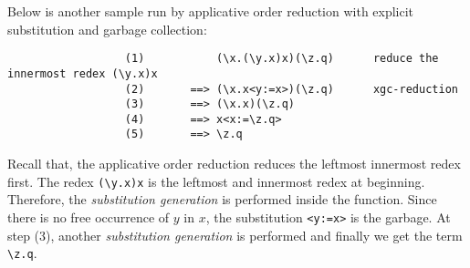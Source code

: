 \begin{exmp}
\normalfont Below is another sample run by applicative order reduction with explicit substitution and garbage collection:
\end{exmp}
\begin{verbatim}
                  (1)           (\x.(\y.x)x)(\z.q)      reduce the innermost redex (\y.x)x
                  (2)       ==> (\x.x<y:=x>)(\z.q)      xgc-reduction
                  (3)       ==> (\x.x)(\z.q)
                  (4)       ==> x<x:=\z.q>
                  (5)       ==> \z.q
\end{verbatim}

Recall that, the applicative order reduction reduces the leftmost innermost redex first. The redex \verb|(\y.x)x| is the leftmost and innermost redex at beginning. Therefore, the \textit{substitution generation} is performed inside the function. Since there is no free occurrence of $y$ in $x$, the substitution \verb|<y:=x>| is the garbage. At step (3), another \textit{substitution generation} is performed and finally we get the term \verb|\z.q|. 


















